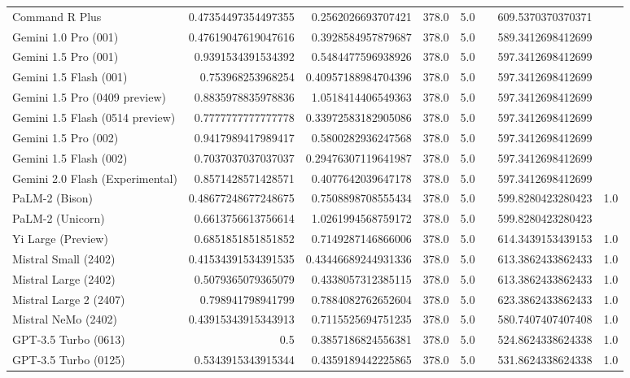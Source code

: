 \begin{table}[htp]
{\begin{tabular}{lrrrrrrr}
Command R Plus & 0.47354497354497355 & 0.2562026693707421 & 378.0 & 5.0 &  & 609.5370370370371 &  \\
Gemini 1.0 Pro (001) & 0.47619047619047616 & 0.3928584957879687 & 378.0 & 5.0 &  & 589.3412698412699 &  \\
Gemini 1.5 Pro (001) & 0.9391534391534392 & 0.5484477596938926 & 378.0 & 5.0 &  & 597.3412698412699 &  \\
Gemini 1.5 Flash (001) & 0.753968253968254 & 0.40957188984704396 & 378.0 & 5.0 &  & 597.3412698412699 &  \\
Gemini 1.5 Pro (0409 preview) & 0.8835978835978836 & 1.0518414406549363 & 378.0 & 5.0 &  & 597.3412698412699 &  \\
Gemini 1.5 Flash (0514 preview) & 0.7777777777777778 & 0.33972583182905086 & 378.0 & 5.0 &  & 597.3412698412699 &  \\
Gemini 1.5 Pro (002) & 0.9417989417989417 & 0.5800282936247568 & 378.0 & 5.0 &  & 597.3412698412699 &  \\
Gemini 1.5 Flash (002) & 0.7037037037037037 & 0.29476307119641987 & 378.0 & 5.0 &  & 597.3412698412699 &  \\
Gemini 2.0 Flash (Experimental) & 0.8571428571428571 & 0.4077642039647178 & 378.0 & 5.0 &  & 597.3412698412699 &  \\
PaLM-2 (Bison) & 0.48677248677248675 & 0.7508898708555434 & 378.0 & 5.0 &  & 599.8280423280423 & 1.0 \\
PaLM-2 (Unicorn) & 0.6613756613756614 & 1.0261994568759172 & 378.0 & 5.0 &  & 599.8280423280423 &  \\
Yi Large (Preview) & 0.6851851851851852 & 0.7149287146866006 & 378.0 & 5.0 &  & 614.3439153439153 & 1.0 \\
Mistral Small (2402) & 0.41534391534391535 & 0.43446689244931336 & 378.0 & 5.0 &  & 613.3862433862433 & 1.0 \\
Mistral Large (2402) & 0.5079365079365079 & 0.4338057312385115 & 378.0 & 5.0 &  & 613.3862433862433 & 1.0 \\
Mistral Large 2 (2407) & 0.798941798941799 & 0.7884082762652604 & 378.0 & 5.0 &  & 623.3862433862433 & 1.0 \\
Mistral NeMo (2402) & 0.43915343915343913 & 0.7115525694751235 & 378.0 & 5.0 &  & 580.7407407407408 & 1.0 \\
GPT-3.5 Turbo (0613) & 0.5 & 0.3857186824556381 & 378.0 & 5.0 &  & 524.8624338624338 & 1.0 \\
GPT-3.5 Turbo (0125) & 0.5343915343915344 & 0.4359189442225865 & 378.0 & 5.0 &  & 531.8624338624338 & 1.0 \\

\end{tabular}}
\end{table}
